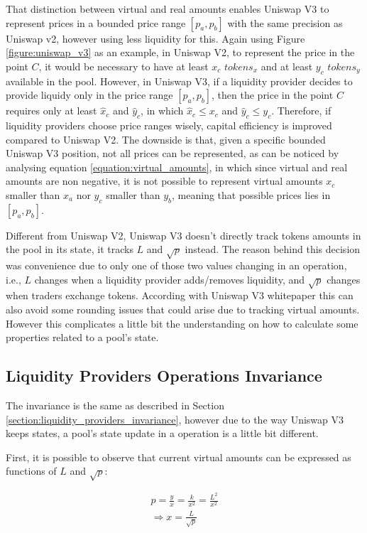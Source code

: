 \documentclass{article}
\begin{document}
That distinction between virtual and real amounts enables Uniswap V3 to represent prices in a bounded price range $[p_a, p_b]$ with the same precision as Uniswap v2, however using less liquidity for this.
Again using Figure \ref{figure:uniswap_v3} as an example, in Uniswap V2, to represent the price in the point $C$, it would be necessary to have at least $x_c$ $tokens_x$ and at least $y_c$ $tokens_y$ available in the pool.
However, in Uniswap V3, if a liquidity provider decides to provide liquidy only in the price range $[p_a, p_b]$, then the price in the point $C$ requires only at least $\hat{x}_c$ and $\hat{y}_c$, in which $\hat{x}_c \leq x_c$ and $\hat{y}_c \leq y_c$.
Therefore, if liquidity providers choose price ranges wisely, capital efficiency is improved compared to Uniswap V2.
The downside is that, given a specific bounded Uniswap V3 position, not all prices can be represented, as can be noticed by analysing equation \ref{equation:virtual_amounts}, in which since virtual and real amounts are non negative, it is not possible to represent virtual amounts $x_c$ smaller than $x_a$ nor $y_c$ smaller than $y_b$, meaning that possible prices lies in $[p_a, p_b]$.

Different from Uniswap V2, Uniswap V3 doesn't directly track tokens amounts in the pool in its state, it tracks $L$ and $\sqrt{p}$ instead.
The reason behind this decision was convenience due to only one of those two values changing in an operation, i.e., $L$ changes when a liquidity provider adds/removes liquidity, and $\sqrt{p}$ changes when traders exchange tokens.
According with Uniswap V3 whitepaper this can also avoid some rounding issues that could arise due to tracking virtual amounts.
However this complicates a little bit the understanding on how to calculate some properties related to a pool's state.

\subsection{Liquidity Providers Operations Invariance}

The invariance is the same as described in Section \ref{section:liquidity_providers_invariance}, however due to the way Uniswap V3 keeps states, a pool's state update in a operation is a little bit different.

First, it is possible to observe that current virtual amounts can be expressed as functions of $L$ and $\sqrt{p}$:

\begin{equation}
    \label{equation:x}
    \begin{split}
        p=\frac{y}{x}=\frac{k}{x^2}=\frac{L^2}{x^2} \\
        \Rightarrow x=\frac{L}{\sqrt{p}}
    \end{split}
\end{equation}
\end{document}

